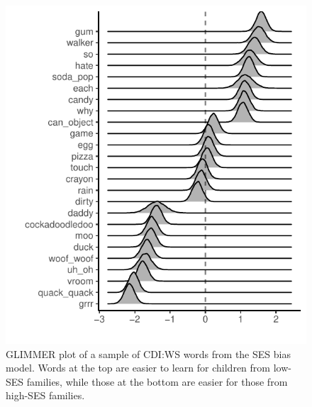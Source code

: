 \documentclass[10pt, letterpaper]{article}
\newenvironment{CodeChunk}{}{}
\begin{document}
\begin{CodeChunk}
\begin{figure}[H]

{\centering \includegraphics[width=\linewidth]{figs/smGLIMMER_ses_prodWS} 

}

\caption[GLIMMER plot of a sample of CDI:WS words from the SES bias model]{GLIMMER plot of a sample of CDI:WS words from the SES bias model. Words at the top are easier to learn for children from low-SES families, while those at the bottom are easier for those from high-SES families.}\label{fig:ses-glimmer}
\end{figure}
\end{CodeChunk}
\end{document}

